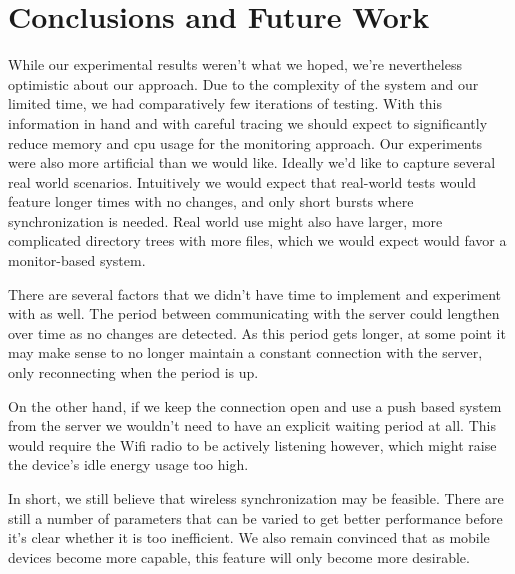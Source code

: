\section{Conclusions and Future Work}
\label{sec:Conclusions and Future Work}

While our experimental results weren't what we hoped, we're nevertheless optimistic about our approach.  Due to the complexity of the system and our limited time, we had comparatively few iterations of testing.  With this information in hand and with careful tracing we should expect to significantly reduce memory and cpu usage for the monitoring approach.  Our experiments were also more artificial than we would like.  Ideally we'd like to capture several real world scenarios.  Intuitively we would expect that real-world tests would feature longer times with no changes, and only short bursts where synchronization is needed.  Real world use might also have larger, more complicated directory trees with more files, which we would expect would favor a monitor-based system.

There are several factors that we didn't have time to implement and experiment with as well.  The period between communicating with the server could lengthen over time as no changes are detected.  As this period gets longer, at some point it may make sense to no longer maintain a constant connection with the server, only reconnecting when the period is up.  

On the other hand, if we keep the connection open and use a push based system from the server we wouldn't need to have an explicit waiting period at all.  This would require the Wifi radio to be actively listening however, which might raise the device's idle energy usage too high.

In short, we still believe that wireless synchronization may be feasible.  There are still a number of parameters that can be varied to get better performance before it's clear whether it is too inefficient.  We also remain convinced that as mobile devices become more capable, this feature will only become more desirable.
